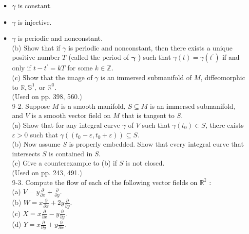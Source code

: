 \documentclass[10pt]{article}
\begin{document}
\begin{itemize}
  \item $\gamma$ is constant.
  \item $\gamma$ is injective.
  \item $\gamma$ is periodic and nonconstant.\\
(b) Show that if $\gamma$ is periodic and nonconstant, then there exists a unique positive number $T$ (called the period of $\boldsymbol{\gamma}$ ) such that $\gamma(t)=\gamma\left(t^{\prime}\right)$ if and only if $t-t^{\prime}=k T$ for some $k \in \mathbb{Z}$.\\
(c) Show that the image of $\gamma$ is an immersed submanifold of $M$, diffeomorphic to $\mathbb{R}, \mathbb{S}^{1}$, or $\mathbb{R}^{0}$.\\
(Used on pp. 398, 560.)\\
9-2. Suppose $M$ is a smooth manifold, $S \subseteq M$ is an immersed submanifold, and $V$ is a smooth vector field on $M$ that is tangent to $S$.\\
(a) Show that for any integral curve $\gamma$ of $V$ such that $\gamma\left(t_{0}\right) \in S$, there exists $\varepsilon>0$ such that $\gamma\left(\left(t_{0}-\varepsilon, t_{0}+\varepsilon\right)\right) \subseteq S$.\\
(b) Now assume $S$ is properly embedded. Show that every integral curve that intersects $S$ is contained in $S$.\\
(c) Give a counterexample to (b) if $S$ is not closed.\\
(Used on pp. 243, 491.)\\
9-3. Compute the flow of each of the following vector fields on $\mathbb{R}^{2}$ :\\
(a) $V=y \frac{\partial}{\partial x}+\frac{\partial}{\partial y}$.\\
(b) $W=x \frac{\partial}{\partial x}+2 y \frac{\partial}{\partial y}$.\\
(c) $X=x \frac{\partial}{\partial x}-y \frac{\partial}{\partial y}$.\\
(d) $Y=x \frac{\partial}{\partial y}+y \frac{\partial}{\partial x}$.
\end{itemize}
\end{document}
